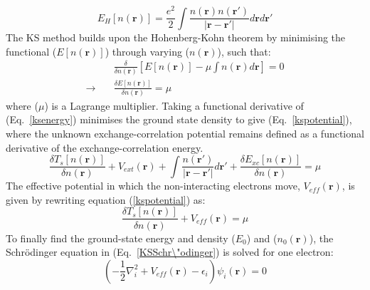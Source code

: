 %
\begin{equation}
E_H[n(\mathbf{r})] = \frac{e^2}{2} \int \frac{n(\mathbf{r})n(\mathbf{r'})}{|\mathbf{r - r'}|}d \mathbf{r}d \mathbf{r'}
\end{equation}
%
The KS method builds upon the Hohenberg-Kohn theorem by minimising the functional ($E[n(\mathbf{r})]$) through varying ($n(\mathbf{r})$), such that:
%
\begin{equation} \label{minimise}
\begin{split}
& \frac{\delta}{\delta n(\mathbf{r})} \left[ E[n(\mathbf{r})] - \mu \int n(\mathbf{r}) d \mathbf{r} \right] = 0 \\
\rightarrow \quad & \frac{\delta E[n(\mathbf{r})]}{\delta n(\mathbf{r})} = \mu
\end{split}
\end{equation}
%
where ($\mu$) is a Lagrange multiplier. Taking a functional derivative of (Eq.~\ref{ksenergy}) minimises the ground state density to give (Eq.~\ref{kspotential}), where the unknown exchange-correlation potential remains defined as a functional derivative of the exchange-correlation energy.
%
\begin{equation} \label{kspotential}
\frac{\delta T_s[n(\mathbf{r})]}{\delta n(\mathbf{r})} + V_{ext}(\mathbf{r}) + \int \frac{n(\mathbf{r'})}{|\mathbf{r - r'}|}d \mathbf{r'} + \frac{\delta E_{xc}[n(\mathbf{r})]}{\delta n(\mathbf{r})}  = \mu 
\end{equation}
%
The effective potential in which the non-interacting electrons move, $V_{eff}(\mathbf{r})$, is given by rewriting equation (\ref{kspotential}) as:
%
\begin{equation} 
\frac{\delta T_s[n(\mathbf{r})]}{\delta n(\mathbf{r})} + V_{eff}(\mathbf{r}) = \mu 
\end{equation}
%
To finally find the ground-state energy and density ($E_0$) and ($n_0 (\mathbf{r})$), the Schr\"odinger equation in (Eq.~\ref{KSSchr\"odinger}) is solved for one electron:
%
\begin{equation}
\left( - \frac{1}{2} \nabla^2_i + V_{eff}(\mathbf{r}) - \epsilon_i \right) \psi_i (\mathbf{r}) = 0
\end{equation} 
%
%
%
